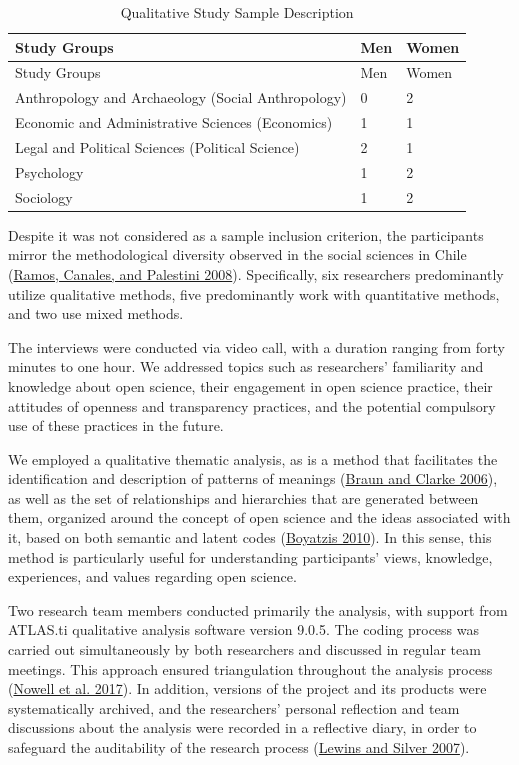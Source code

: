 \documentclass[
  letterpaper,
  DIV=11,
  numbers=noendperiod]{scrartcl}
\begin{document}
\hypertarget{tbl-qual-sample}{}
\begin{longtable}[]{@{}lll@{}}
\caption{\label{tbl-qual-sample}Qualitative Study Sample
Description}\tabularnewline
\toprule\noalign{}
Study Groups & Men & Women \\
\midrule\noalign{}
\endfirsthead
\toprule\noalign{}
Study Groups & Men & Women \\
\midrule\noalign{}
\endhead
\bottomrule\noalign{}
\endlastfoot
Anthropology and Archaeology (Social Anthropology) & 0 & 2 \\
Economic and Administrative Sciences (Economics) & 1 & 1 \\
Legal and Political Sciences (Political Science) & 2 & 1 \\
Psychology & 1 & 2 \\
Sociology & 1 & 2 \\
\end{longtable}

Despite it was not considered as a sample inclusion criterion, the
participants mirror the methodological diversity observed in the social
sciences in Chile (\protect\hyperlink{ref-ramos_campo_2008}{Ramos,
Canales, and Palestini 2008}). Specifically, six researchers
predominantly utilize qualitative methods, five predominantly work with
quantitative methods, and two use mixed methods.

The interviews were conducted via video call, with a duration ranging
from forty minutes to one hour. We addressed topics such as researchers'
familiarity and knowledge about open science, their engagement in open
science practice, their attitudes of openness and transparency
practices, and the potential compulsory use of these practices in the
future.

We employed a qualitative thematic analysis, as is a method that
facilitates the identification and description of patterns of meanings
(\protect\hyperlink{ref-braun_using_2006}{Braun and Clarke 2006}), as
well as the set of relationships and hierarchies that are generated
between them, organized around the concept of open science and the ideas
associated with it, based on both semantic and latent codes
(\protect\hyperlink{ref-boyatzis_transforming_2010}{Boyatzis 2010}). In
this sense, this method is particularly useful for understanding
participants' views, knowledge, experiences, and values regarding open
science.

Two research team members conducted primarily the analysis, with support
from ATLAS.ti qualitative analysis software version 9.0.5. The coding
process was carried out simultaneously by both researchers and discussed
in regular team meetings. This approach ensured triangulation throughout
the analysis process
(\protect\hyperlink{ref-nowell_thematic_2017}{Nowell et al. 2017}). In
addition, versions of the project and its products were systematically
archived, and the researchers' personal reflection and team discussions
about the analysis were recorded in a reflective diary, in order to
safeguard the auditability of the research process
(\protect\hyperlink{ref-lewins_using_2007}{Lewins and Silver 2007}).
\end{document}
